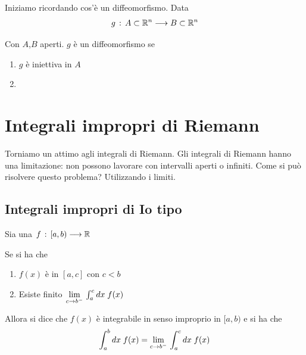 Iniziamo ricordando cos'è un diffeomorfismo. Data
\begin{align}
	g \, : \, A \subset \mathbb{R}^n \longrightarrow B \subset \mathbb{R}^n
\end{align}

Con $A$,$B$ aperti. $g$ è un diffeomorfismo se
\begin{enumerate}
	\item $g$ è iniettiva in $A$
	\item															
\end{enumerate}

\newpage

\section{Integrali impropri di Riemann}

Torniamo un attimo agli integrali di Riemann. Gli integrali di Riemann hanno una limitazione: non possono lavorare con intervalli aperti o infiniti. Come si può risolvere questo problema? Utilizzando i limiti.

\subsection{Integrali impropri di Io tipo}

Sia una $f \, : \, [a,b) \longrightarrow \mathbb{R}$

Se si ha che
\begin{enumerate}
	\item $f(x)$ è \Rint in $[a,c]$ con $c<b$
	\item Esiste finito $\underset{c \rightarrow b^-}{\lim} \, \int_{a}^{c} dx \; f(x)$ 
\end{enumerate}

Allora si dice che $f(x)$ è integrabile in senso improprio in $[a,b)$ e si ha che
\begin{align}
	\int_{a}^{b} dx \; f(x)=\underset{c \rightarrow b^-}{\lim} \, \int_{a}^{c} dx \; f(x)
\end{align}

\begin{figure}[!htb]
\end{figure}


